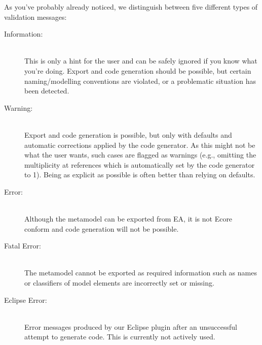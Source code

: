 As you've probably already noticed, we distinguish between five different types of validation messages:
\begin{description}
  \item[Information:]~\\
  This is only a hint for the user and can be safely ignored if you know what you're doing.
  Export and code generation should be possible, but certain naming/modelling conventions are violated, or a problematic situation has been detected.
  \item[Warning:]~\\ Export and code generation is possible, but only with defaults and automatic corrections applied by the code generator.
  As this might not be what the user wants, such cases are flagged as warnings (e.g., omitting the multiplicity at references which is automatically set by the code generator to 1).
  Being as explicit as possible is often better than relying on defaults.
  \item[Error:]~\\ Although the metamodel can be exported from EA, it is not Ecore conform and code generation will not be possible.
  \item[Fatal Error:]~\\ The metamodel cannot be exported as required information such as names or classifiers of model elements are incorrectly set or missing.
  \item[Eclipse Error:]~\\ Error messages produced by our Eclipse plugin after an unsuccessful attempt to generate code.
  This is currently not actively used.

\end{description}